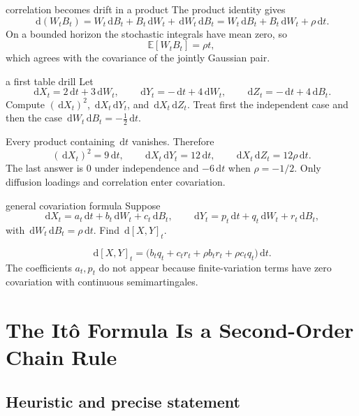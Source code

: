 \documentclass[10pt]{article}
\newcommand{\E}{\mathbb E}
\newcommand{\1}{\mathbf 1}
\newcommand{\dd}{\,\mathrm d}
\theoremstyle{definition}
\begin{document}
\begin{boardexample}{correlation becomes drift in a product}
The product identity gives
\[
\dd(W_tB_t)
=W_t\dd B_t+B_t\dd W_t+\dd W_t\dd B_t
=W_t\dd B_t+B_t\dd W_t+\rho\dd t.
\]
On a bounded horizon the stochastic integrals have mean zero, so
\[
\E[W_tB_t]=\rho t,
\]
which agrees with the covariance of the jointly Gaussian pair.
\end{boardexample}

\begin{studentexercise}{a first table drill}
Let
\[
\dd X_t=2\dd t+3\dd W_t,\qquad
\dd Y_t=-\dd t+4\dd W_t,\qquad
\dd Z_t=-\dd t+4\dd B_t.
\]
Compute \((\dd X_t)^2\), \(\dd X_t\dd Y_t\), and
\(\dd X_t\dd Z_t\). Treat first the independent case and then the case
\(\dd W_t\dd B_t=-\tfrac12\dd t\).
\end{studentexercise}
\begin{shortsolution}
Every product containing \(\dd t\) vanishes. Therefore
\[
(\dd X_t)^2=9\dd t,\qquad
\dd X_t\dd Y_t=12\dd t,\qquad
\dd X_t\dd Z_t=12\rho\dd t.
\]
The last answer is \(0\) under independence and \(-6\dd t\) when
\(\rho=-1/2\). Only diffusion loadings and correlation enter covariation.
\end{shortsolution}

\begin{studentexercise}{general covariation formula}
Suppose
\[
\dd X_t=a_t\dd t+b_t\dd W_t+c_t\dd B_t,\qquad
\dd Y_t=p_t\dd t+q_t\dd W_t+r_t\dd B_t,
\]
with \(\dd W_t\dd B_t=\rho\dd t\). Find
\(\dd[X,Y]_t\).
\end{studentexercise}
\begin{shortsolution}
\[
\boxed{
\dd[X,Y]_t
=\bigl(b_tq_t+c_tr_t+\rho b_tr_t+\rho c_tq_t\bigr)\dd t.}
\]
The coefficients \(a_t,p_t\) do not appear because finite-variation terms
have zero covariation with continuous semimartingales.
\end{shortsolution}

\section{The It\^o Formula Is a Second-Order Chain Rule}

\subsection{Heuristic and precise statement}
\end{document}
